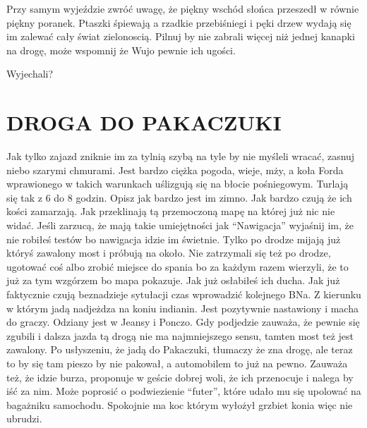 \documentclass[ms,a4paper]{memoir}
\newcommand{\RED}[1]{\textcolor{red!50!black}{\MakeUppercase{#1}}}
\begin{document}
Przy samym wyjeździe zwróć uwagę, że piękny wschód słońca przeszedł w równie piękny poranek.
Ptaszki śpiewają a rzadkie przebiśniegi i pęki drzew wydają się im zalewać cały świat zielonoscią.
Pilnuj by nie zabrali więcej niż jednej kanapki na drogę, może wspomnij że Wujo pewnie ich ugości.

Wyjechali?
\chapter{\RED{Droga do Pakaczuki}}

Jak tylko zajazd zniknie im za tylnią szybą na tyle by nie myśleli wracać, zasnuj niebo szarymi chmurami.
Jest bardzo ciężka pogoda, wieje, mży, a koła Forda wprawionego w takich warunkach uślizgują się na błocie pośniegowym.
Turlają się tak z 6 do 8 godzin.
Opisz jak bardzo jest im zimno.
Jak bardzo czują że ich kości zamarzają.
Jak przeklinają tą przemoczoną mapę na której już nic nie widać.
Jeśli zarzucą, że mają takie umiejętności jak ``Nawigacja'' wyjaśnij im, że nie robiłeś testów bo nawigacja idzie im świetnie.
Tylko po drodze mijają już któryś zawalony most i próbują na około.
Nie zatrzymali się też po drodze, ugotować coś albo zrobić miejsce do spania bo za każdym razem wierzyli, że to już za tym wzgórzem bo mapa pokazuje.
Jak już osłabiłeś ich ducha.
Jak już faktycznie czują beznadzieje sytułacji czas wprowadzić kolejnego BNa.
Z kierunku w którym jadą nadjeżdza na koniu indianin.
Jest pozytywnie nastawiony i macha do graczy.
Odziany jest w Jeansy i Ponczo.
Gdy podjedzie zauważa, że pewnie się zgubili i dalsza jazda tą drogą nie ma najmniejszego sensu, tamten most też jest zawalony.
Po usłyszeniu, że jadą do Pakaczuki, tłumaczy że zna drogę, ale teraz to by się tam pieszo by nie pakował, a automobilem to już na pewno.
Zauważa też, że idzie burza, proponuje w geście dobrej woli, że ich przenocuje i nalega by iść za nim.
Może poprosić o podwiezienie ``futer'', które udało mu się upolować na bagażniku samochodu.
Spokojnie ma koc którym wyłożył grzbiet konia więc nie ubrudzi.



\end{document}
